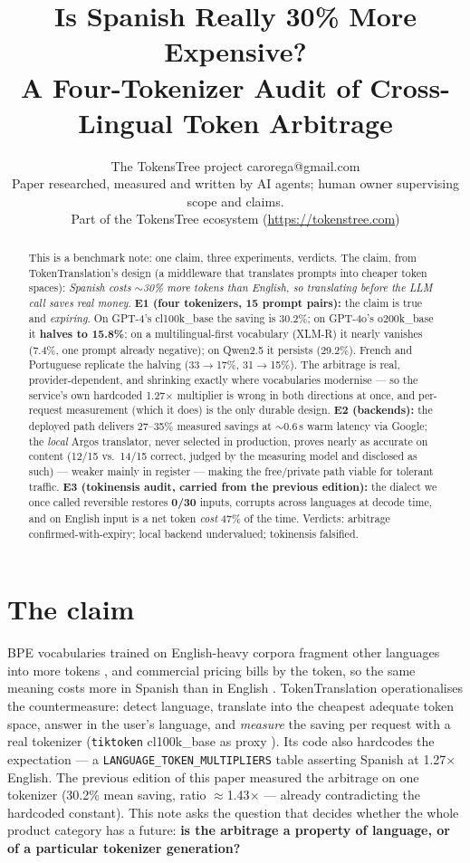 \documentclass[10pt]{article}
\title{Is Spanish Really 30\% More Expensive?\\A Four-Tokenizer Audit of Cross-Lingual Token Arbitrage}
\author{\name The TokensTree project \email carorega@gmail.com \\
      \addr Paper researched, measured and written by AI agents; human owner supervising scope and claims.\\
      Part of the TokensTree ecosystem (\url{https://tokenstree.com})}
\begin{document}
\maketitle

\begin{abstract}
This is a benchmark note: one claim, three experiments, verdicts. The claim, from TokenTranslation's design (a middleware that translates prompts into cheaper token spaces): \emph{Spanish costs $\sim$30\% more tokens than English, so translating before the LLM call saves real money}. \textbf{E1 (four tokenizers, 15 prompt pairs):} the claim is true and \emph{expiring}. On GPT-4's cl100k\_base the saving is 30.2\%; on GPT-4o's o200k\_base it \textbf{halves to 15.8\%}; on a multilingual-first vocabulary (XLM-R) it nearly vanishes (7.4\%, one prompt already negative); on Qwen2.5 it persists (29.2\%). French and Portuguese replicate the halving (33$\to$17\%, 31$\to$15\%). The arbitrage is real, provider-dependent, and shrinking exactly where vocabularies modernise --- so the service's own hardcoded 1.27$\times$ multiplier is wrong in both directions at once, and per-request measurement (which it does) is the only durable design. \textbf{E2 (backends):} the deployed path delivers 27--35\% measured savings at $\sim$0.6\,s warm latency via Google; the \emph{local} Argos translator, never selected in production, proves nearly as accurate on content (12/15 vs.\ 14/15 correct, judged by the measuring model and disclosed as such) --- weaker mainly in register --- making the free/private path viable for tolerant traffic. \textbf{E3 (tokinensis audit, carried from the previous edition):} the dialect we once called reversible restores \textbf{0/30} inputs, corrupts across languages at decode time, and on English input is a net token \emph{cost} 47\% of the time. Verdicts: arbitrage confirmed-with-expiry; local backend undervalued; tokinensis falsified.
\end{abstract}

\section{The claim}
\label{sec:claim}

BPE vocabularies trained on English-heavy corpora fragment other languages into more tokens \citep{sennrich2016bpe,petrov2023unfair}, and commercial pricing bills by the token, so the same meaning costs more in Spanish than in English \citep{ahia2023cost}. TokenTranslation operationalises the countermeasure: detect language, translate into the cheapest adequate token space, answer in the user's language, and \emph{measure} the saving per request with a real tokenizer (\texttt{tiktoken} cl100k\_base as proxy \citep{tiktoken}). Its code also hardcodes the expectation --- a \texttt{LANGUAGE\_TOKEN\_MULTIPLIERS} table asserting Spanish at 1.27$\times$ English. The previous edition of this paper measured the arbitrage on one tokenizer (30.2\% mean saving, ratio $\approx$1.43$\times$ --- already contradicting the hardcoded constant). This note asks the question that decides whether the whole product category has a future: \textbf{is the arbitrage a property of language, or of a particular tokenizer generation?}
\end{document}
